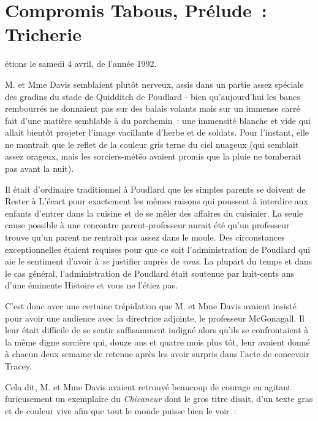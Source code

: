 \chapter{Compromis Tabous, Prélude~: Tricherie}

 étions le samedi 4 avril, de l'année 1992.

\hplettrineextrapara
M. et Mme Davis semblaient plutôt nerveux, assis dans un partie assez spéciale des gradins du stade de Quidditch de Poudlard - bien qu'aujourd'hui les bancs rembourrés ne donnaient pas sur des balais volants mais sur un immense carré fait d'une matière semblable à du parchemin~: une immensité blanche et vide qui allait bientôt projeter l'image vacillante d'herbe et de soldats. Pour l'instant, elle ne montrait que le reflet de la couleur gris terne du ciel nuageux (qui semblait assez orageux, mais les sorciers-météo avaient promis que la pluie ne tomberait pas avant la nuit).

Il était d'ordinaire traditionnel à Poudlard que les simples parents se doivent de Rester à L'écart pour exactement les mêmes raisons qui poussent à interdire aux enfants d'entrer dans la cuisine et de se mêler des affaires du cuisinier. La seule cause possible à une rencontre parent-professeur aurait été qu'un professeur trouve qu'un parent ne rentrait pas assez dans le moule. Des circonstances exceptionnelles étaient requises pour que ce soit l'administration de Poudlard qui aie le sentiment d'avoir à \emph{se} justifier auprès de \emph{vous}. La plupart du temps et dans le cas général, l'administration de Poudlard était soutenue par huit-cents ans d'une éminente Histoire et vous ne l'étiez pas.

C'est donc avec une certaine trépidation que M. et Mme Davis avaient insisté pour avoir une audience avec la directrice adjointe, le professeur McGonagall. Il leur était difficile de se sentir suffisamment indigné alors qu'ils se confrontaient à la même digne sorcière qui, douze ans et quatre mois plus tôt, leur avaient donné à chacun deux semaine de retenue après les avoir surpris dans l'acte de concevoir Tracey.

Cela dit, M. et Mme Davis avaient retrouvé beaucoup de courage en agitant furieusement un exemplaire du \emph{Chicaneur} dont le gros titre disait, d'un texte gras et de couleur vive afin que tout le monde puisse bien le voir~:


